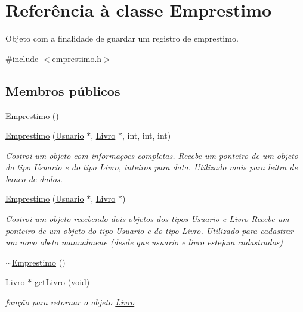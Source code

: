 \hypertarget{class_emprestimo}{}\section{Referência à classe Emprestimo}
\label{class_emprestimo}


Objeto com a finalidade de guardar um registro de emprestimo.  




{\ttfamily \#include $<$emprestimo.\+h$>$}

\subsection*{Membros públicos}
\begin{DoxyCompactItemize}
\item 
\hyperlink{class_emprestimo_a1616ab12bb52641312da3eda7cf65a16}{Emprestimo} ()
\item 
\hyperlink{class_emprestimo_a1ec18d0cc6acc6ff3699fbd8a40d44f4}{Emprestimo} (\hyperlink{class_usuario}{Usuario} $\ast$, \hyperlink{class_livro}{Livro} $\ast$, int, int, int)
\begin{DoxyCompactList}\small\item\em Costroi um objeto com informaçoes completas. Recebe um ponteiro de um objeto do tipo \hyperlink{class_usuario}{Usuario} e do tipo \hyperlink{class_livro}{Livro}, inteiros para data. Utilizado mais para leitra de banco de dados. \end{DoxyCompactList}\item 
\hyperlink{class_emprestimo_aff4befdfe5863640b597ade37f492212}{Emprestimo} (\hyperlink{class_usuario}{Usuario} $\ast$, \hyperlink{class_livro}{Livro} $\ast$)
\begin{DoxyCompactList}\small\item\em Costroi um objeto recebendo dois objetos dos tipos \hyperlink{class_usuario}{Usuario} e \hyperlink{class_livro}{Livro} Recebe um ponteiro de um objeto do tipo \hyperlink{class_usuario}{Usuario} e do tipo \hyperlink{class_livro}{Livro}. Utilizado para cadastrar um novo obeto manualmene (desde que usuario e livro estejam cadastrados) \end{DoxyCompactList}\item 
\hyperlink{class_emprestimo_a3112936af81ada69746c1eb3ffa496c9}{$\sim$\+Emprestimo} ()
\item 
\hyperlink{class_livro}{Livro} $\ast$ \hyperlink{class_emprestimo_ae38842ee822774d87f2ec4eeff34013c}{get\+Livro} (void)
\begin{DoxyCompactList}\small\item\em função para retornar o objeto \hyperlink{class_livro}{Livro} \end{DoxyCompactList}\item 

\end{DoxyCompactItemize}
